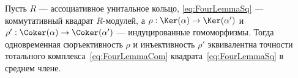 \documentclass[
	extrafontsizes,
	11pt,
	hyphens,
]{memoir}
\begin{document}
\begin{theorem}
\label{thm:FourLemma}
Пусть \(R\) --- ассоциативное унитальное кольцо, \eqref{eq:FourLemmaSq} --- коммутативный квадрат \(R\)-мо\-ду\-лей, а
\(\rho : \Ker(\alpha) \to \Ker(\alpha')\) и
\(\rho' : \Coker(\alpha) \to \Coker(\alpha')\) ---
индуцированные гомоморфизмы.
Тогда одновременная сюръективность \(\rho\) и инъективность \(\rho'\) эквивалентна точности тотального комплекса~\eqref{eq:FourLemmaCom} квадрата~\eqref{eq:FourLemmaSq} в среднем члене.
%

\end{theorem}
\end{document}
